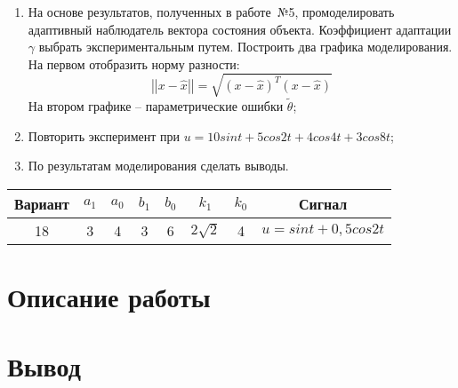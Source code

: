 \documentclass[14pt, a4paper]{extarticle}
\begin{document}
	\begin{enumerate}
		\item На основе результатов, полученных в работе~№5, промоделировать адаптивный наблюдатель вектора состояния объекта. Коэффициент адаптации $\gamma$ выбрать экспериментальным путем. Построить два графика моделирования. На первом отобразить норму разности: $$\left|\left|x-\hat{x}\right|\right|=\sqrt{(x-\hat{x})^T(x-\hat{x})}$$ На втором графике -- параметрические ошибки $\tilde{\theta}$;
		\item Повторить эксперимент при $u=10sint+5cos2t+4cos4t+3cos8t$;
		\item По результатам моделирования сделать выводы.
 	\end{enumerate}
	\begin{table}[H]
		\centering
		\begin{tabular}{|c|c|c|c|c|c|c|c|}
			\hline
			Вариант & $a_1$ & $a_0$ & $b_1$ & $b_0$ & $k_1$ & $k_0$ & Сигнал \\\hline
			18 & 3 & 4 & 3 & 6 & $2\sqrt{2}$ & 4 & $u = sint+0,5cos2t$ \\\hline
		\end{tabular}
	\end{table}
	
	\newpage
	
	\section*{Описание работы}
	
	
	
	\newpage
	
	\section*{Вывод}
	
\end{document}
